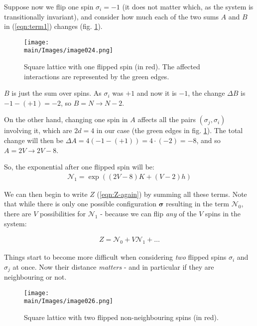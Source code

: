 \documentclass[../../main.tex]{subfiles}
\begin{document}
\medskip

Suppose now we flip one spin $\sigma_i = -1$ (it does not matter which, as the system is transitionally invariant), and consider how much each of the two sums $A$ and $B$ in (\ref{eqn:term1}) changes (fig. \ref{fig:one-flip}).

\begin{figure}[H]
    \centering
    \texttt{[image: \\main/Images/image024.png]}
    \caption{Square lattice with one flipped spin (in red). The affected interactions are represented by the green edges.\label{fig:one-flip}}
\end{figure}

$B$ is just the sum over spins. As $\sigma_i$ was $+1$ and now it is $-1$, the change $\Delta B$ is $-1 - (+1) = -2$, so $B = N \to N-2$.

On the other hand, changing one spin in $A$ affects all the pairs $(\sigma_j, \sigma_i)$ involving it, which are $2d=4$ in our case (the green edges in fig. \ref{fig:one-flip}). The total change will then be $\Delta A = 4 (-1 - (+1)) = 4 \cdot (-2) = -8$, and so $A = 2V \to 2V-8$.

So, the exponential after one flipped spin will be:
\begin{align}\label{eqn:term1}
    \mathcal{N}_1 = \exp\left((2V - 8)K + (V-2)h\right)
\end{align}

We can then begin to write $Z$ (\ref{eqn:Z-again}) by summing all these terms. Note that while there is only one possible configuration $\bm{\sigma}$ resulting in the term $\mathcal{N}_0$, there are $V$ possibilities for $\mathcal{N}_1$ - because we can flip \textit{any} of the $V$ spins in the system:

\begin{align*}
    Z = \mathcal{N}_0 + V \mathcal{N}_1 + \dots
\end{align*}

Things start to become more difficult when considering \textit{two} flipped spins $\sigma_i$ and $\sigma_j$ at once. Now their distance \textit{matters} - and in particular if they are neighbouring or not.

\begin{figure}[H]
    \centering
    \texttt{[image: \\main/Images/image026.png]}
    \caption{Square lattice with two flipped non-neighbouring spins (in red).\label{fig:two-flip-far}}
\end{figure}
\end{document}
